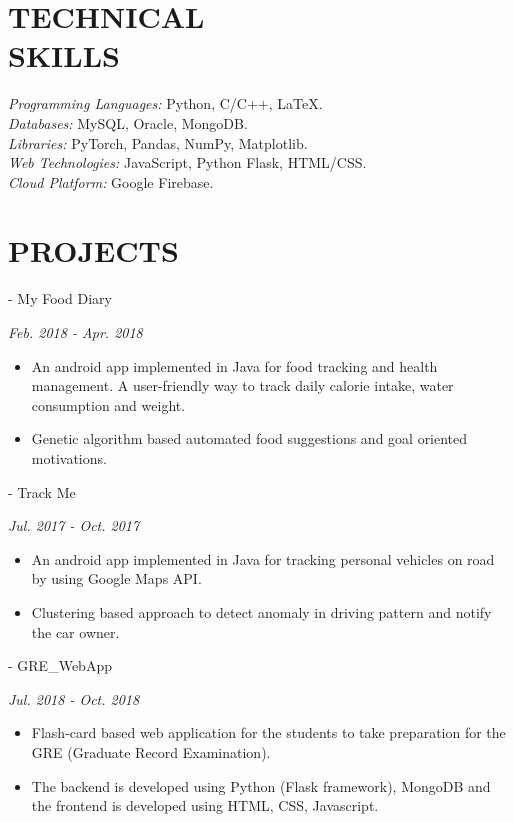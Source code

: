 \documentclass[margin, 10pt]{res} %
\begin{document}
\begin{resume}
\section{TECHNICAL \\ SKILLS} 

{\sl Programming Languages:} Python, C/C++, LaTeX. \\
{\sl Databases:}  MySQL, Oracle, MongoDB. \\
{\sl Libraries:} PyTorch, Pandas, NumPy, Matplotlib. \\
{\sl Web Technologies:} JavaScript, Python Flask, HTML/CSS. \\
{\sl Cloud Platform:} Google Firebase.



\section{PROJECTS}
- {My Food Diary}
{\sl \hfill {\normalfont Feb. 2018 - Apr. 2018} 
\begin{itemize}
    \item An android app implemented in Java for food tracking and health management. A user-friendly way to track daily calorie intake, water consumption and weight.
    \item Genetic algorithm based automated food suggestions and goal oriented motivations.
\end{itemize}
}

- {Track Me}
{\sl \hfill {\normalfont Jul. 2017 - Oct. 2017} 
\begin{itemize}
    \item An android app implemented in Java for tracking personal vehicles on road by using Google Maps API.
    \item Clustering based approach to detect anomaly in driving pattern and notify the car owner.
\end{itemize}
}

- {GRE\_WebApp}
{\sl \hfill {\normalfont Jul. 2018 - Oct. 2018} 
\begin{itemize}
    \item Flash-card based web application for the students to take preparation for the GRE (Graduate Record Examination).
    \item The backend is developed using Python (Flask framework), MongoDB and the frontend is developed using HTML, CSS, Javascript.
\end{itemize}
}


\end{resume}
\end{document}
